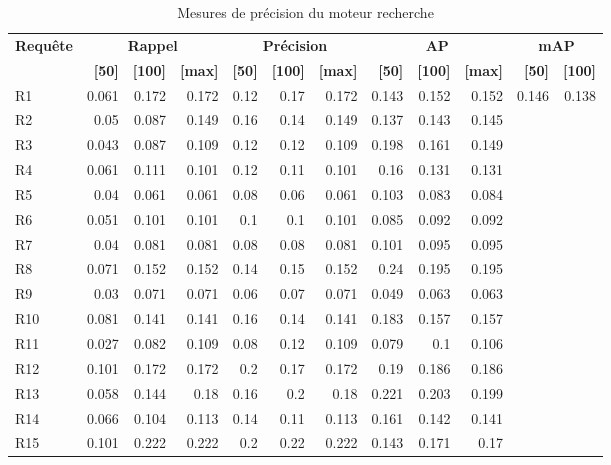 \begin{table}[H]
\centering
\begin{tabular}{l|rrr|rrr|rrr|rr}
\toprule
\textbf{Requête} & \multicolumn{3}{c}{\textbf{Rappel}} & \multicolumn{3}{c}{\textbf{Précision}} & \multicolumn{3}{c}{\textbf{AP}} & \multicolumn{2}{c}{\textbf{mAP}} \\
 & \textbf{[50]} & \textbf{[100]} & \textbf{[max]} & \textbf{[50]} & \textbf{[100]} & \textbf{[max]} & \textbf{[50]} & \textbf{[100]} & \textbf{[max]} & \textbf{[50]} & \textbf{[100]} \\
\midrule
R1 & 0.061 & 0.172 & 0.172 & 0.12 & 0.17 & 0.172 & 0.143 & 0.152 & 0.152 & \multirow{15}{*}{0.146} & \multirow{15}{*}{0.138} \\
R2 & 0.05 & 0.087 & 0.149 & 0.16 & 0.14 & 0.149 & 0.137 & 0.143 & 0.145 \\
R3 & 0.043 & 0.087 & 0.109 & 0.12 & 0.12 & 0.109 & 0.198 & 0.161 & 0.149 \\
R4 & 0.061 & 0.111 & 0.101 & 0.12 & 0.11 & 0.101 & 0.16 & 0.131 & 0.131 \\
R5 & 0.04 & 0.061 & 0.061 & 0.08 & 0.06 & 0.061 & 0.103 & 0.083 & 0.084 \\
R6 & 0.051 & 0.101 & 0.101 & 0.1 & 0.1 & 0.101 & 0.085 & 0.092 & 0.092 \\
R7 & 0.04 & 0.081 & 0.081 & 0.08 & 0.08 & 0.081 & 0.101 & 0.095 & 0.095 \\
R8 & 0.071 & 0.152 & 0.152 & 0.14 & 0.15 & 0.152 & 0.24 & 0.195 & 0.195 \\
R9 & 0.03 & 0.071 & 0.071 & 0.06 & 0.07 & 0.071 & 0.049 & 0.063 & 0.063 \\
R10 & 0.081 & 0.141 & 0.141 & 0.16 & 0.14 & 0.141 & 0.183 & 0.157 & 0.157 \\
R11 & 0.027 & 0.082 & 0.109 & 0.08 & 0.12 & 0.109 & 0.079 & 0.1 & 0.106 \\
R12 & 0.101 & 0.172 & 0.172 & 0.2 & 0.17 & 0.172 & 0.19 & 0.186 & 0.186 \\
R13 & 0.058 & 0.144 & 0.18 & 0.16 & 0.2 & 0.18 & 0.221 & 0.203 & 0.199 \\
R14 & 0.066 & 0.104 & 0.113 & 0.14 & 0.11 & 0.113 & 0.161 & 0.142 & 0.141 \\
R15 & 0.101 & 0.222 & 0.222 & 0.2 & 0.22 & 0.222 & 0.143 & 0.171 & 0.17 \\
\bottomrule
\end{tabular}
\caption{Mesures de précision du moteur recherche}
\label{tab:results}
\end{table}

